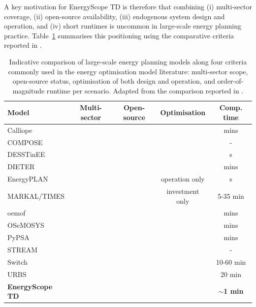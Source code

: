 \documentclass{article}
\newcommand{\cmark}{\ding{51}}
\newcommand{\xmark}{\ding{55}}
\begin{document}
A key motivation for EnergyScope TD is therefore that combining (i) multi-sector coverage, (ii) open-source availability, (iii) endogenous system design and operation, and (iv) short runtimes is uncommon in large-scale energy planning practice. Table~\ref{tab:model-comparison} summarises this positioning using the comparative criteria reported in \citet{limpensEnergyScopeTDNovel2019}.

\begin{table}[t]
  \centering
  \renewcommand{\arraystretch}{1.15}
  \begin{tabularx}{\linewidth}{lcccc}
    \toprule
    \textbf{Model} & \textbf{Multi-sector} & \textbf{Open-source} & \textbf{Optimisation} & \textbf{Comp. time} \\
    \midrule
    Calliope        & \cmark & \cmark & \cmark & mins \\
    COMPOSE         & \cmark & \xmark & \cmark & - \\
    DESSTinEE       & \cmark & \cmark & \xmark & s \\
    DIETER          & \xmark & \cmark & \cmark & mins \\
    EnergyPLAN      & \cmark & \xmark & operation only  & s \\
    MARKAL/TIMES    & \cmark & \xmark & investment only & 5-35 min \\
    oemof           & \cmark & \cmark & \cmark & mins \\
    OSeMOSYS        & \cmark & \cmark & \cmark & mins \\
    PyPSA           & \cmark & \cmark & \cmark & mins \\
    STREAM          & \cmark & \xmark & \xmark & - \\
    Switch          & \xmark & \cmark & \cmark & 10-60 min \\
    URBS            & \xmark & \cmark & \cmark & 20 min \\
    \addlinespace
    \textbf{EnergyScope TD} & \textbf{\cmark} & \textbf{\cmark} & \textbf{\cmark} & \textbf{$\sim$1 min} \\
    \bottomrule
  \end{tabularx}
  \caption{Indicative comparison of large-scale energy planning models along four criteria commonly used in the energy optimisation model literature: multi-sector scope, open-source status, optimisation of both design and operation, and order-of-magnitude runtime per scenario. Adapted from the comparison reported in \citet{limpensEnergyScopeTDNovel2019}.}
  \label{tab:model-comparison}
\end{table}
\end{document}
